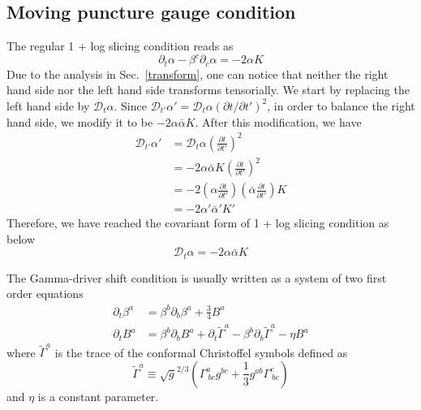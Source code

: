 \documentclass[letterpaper,nofootinbib,prd,amsmath,onecolumn]{revtex4-1}
\begin{document}
\subsection{Moving puncture gauge condition}
The regular 1 + log slicing condition reads as
\begin{equation}\label{1 + log slicing}
\partial_{t}\alpha - \beta^{c}\partial_{c}\alpha = -2\alpha K
\end{equation}
Due to the analysis in Sec.~\ref{transform}, one can notice that neither the right hand side nor the left hand side transforms tensorially. We start by replacing the left hand side by $\mathscr{D}_{t}\alpha$. Since $\mathscr{D}_{t'}\alpha' = \mathscr{D}_{t}\alpha\left(\partial t/\partial t'\right)^{2}$, in order to balance the right hand side, we modify it to be $-2\alpha {\bar \alpha}K$. After this modification, we have
\begin{align*}
\mathscr{D}_{t'}\alpha' & = \mathscr{D}_{t}\alpha\left(\frac{\partial t}{\partial t'}\right)^{2}\\
& = -2\alpha{\bar \alpha}K\left(\frac{\partial t}{\partial t'}\right)^{2}\\
& = -2\left(\alpha\frac{\partial t}{\partial t'}\right)\left({\bar \alpha}\frac{\partial t}{\partial t'}\right)K\\
& = -2\alpha'{\bar \alpha}'K'
\end{align*}
Therefore, we have reached the covariant form of 1 + log slicing condition as below
\begin{equation}\label{covariant 1 + log slicing}
\mathscr{D}_{t}\alpha = -2\alpha{\bar \alpha}K
\end{equation}

The Gamma-driver shift condition is usually written as a system of two first order equations
\begin{subequations}\label{Gamma-driver shift set}
\begin{align}
\partial_{t}\beta^{a} & = \beta^{b}\partial_{b}\beta^{a} + \frac{3}{4}B^{a}\\
\partial_{t}B^{a} & = \beta^{b}\partial_{b}B^{a} + \partial_{t}{\tilde \Gamma}^{a} - \beta^{b}\partial_{b}{\tilde \Gamma}^{a} - \eta B^{a}
\end{align}
\end{subequations}
where ${\tilde \Gamma}^{a}$ is the trace of the conformal Christoffel symbols defined as
\begin{equation}
{\tilde \Gamma}^{a} \equiv \sqrt{g}^{2/3}\left(\Gamma^{a}_{~bc}g^{bc} + \frac{1}{3}g^{ab}\Gamma^{c}_{~bc}\right)
\end{equation}
and $\eta$ is a constant parameter. 
\end{document}
